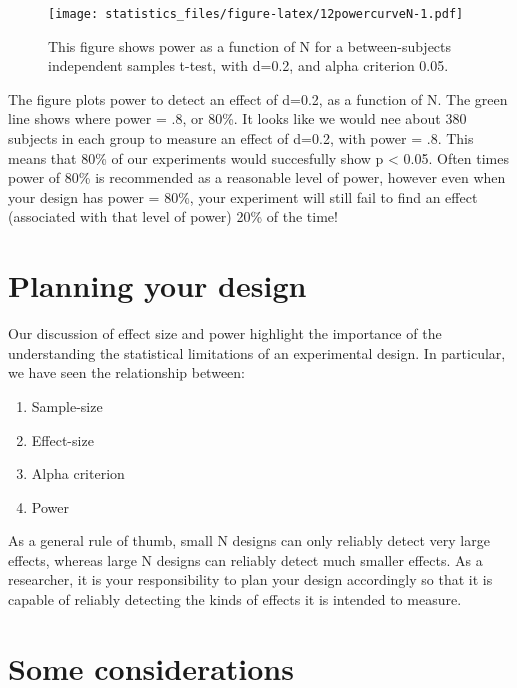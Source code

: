 \documentclass[]{book}
\providecommand{\tightlist}{%
  \setlength{\itemsep}{0pt}\setlength{\parskip}{0pt}}
\begin{document}
\begin{figure}
\centering
\texttt{[image: statistics\_files/figure-latex/12powercurveN-1.pdf]}
\caption{\label{fig:12powercurveN}This figure shows power as a function of N for a between-subjects independent samples t-test, with d=0.2, and alpha criterion 0.05.}
\end{figure}

The figure plots power to detect an effect of d=0.2, as a function of N. The green line shows where power = .8, or 80\%. It looks like we would nee about 380 subjects in each group to measure an effect of d=0.2, with power = .8. This means that 80\% of our experiments would succesfully show p \textless{} 0.05. Often times power of 80\% is recommended as a reasonable level of power, however even when your design has power = 80\%, your experiment will still fail to find an effect (associated with that level of power) 20\% of the time!

\hypertarget{planning-your-design}{%
\section{Planning your design}\label{planning-your-design}}

Our discussion of effect size and power highlight the importance of the understanding the statistical limitations of an experimental design. In particular, we have seen the relationship between:

\begin{enumerate}
\def\labelenumi{\arabic{enumi}.}
\tightlist
\item
  Sample-size
\item
  Effect-size
\item
  Alpha criterion
\item
  Power
\end{enumerate}

As a general rule of thumb, small N designs can only reliably detect very large effects, whereas large N designs can reliably detect much smaller effects. As a researcher, it is your responsibility to plan your design accordingly so that it is capable of reliably detecting the kinds of effects it is intended to measure.

\hypertarget{some-considerations}{%
\section{Some considerations}\label{some-considerations}}
\end{document}

